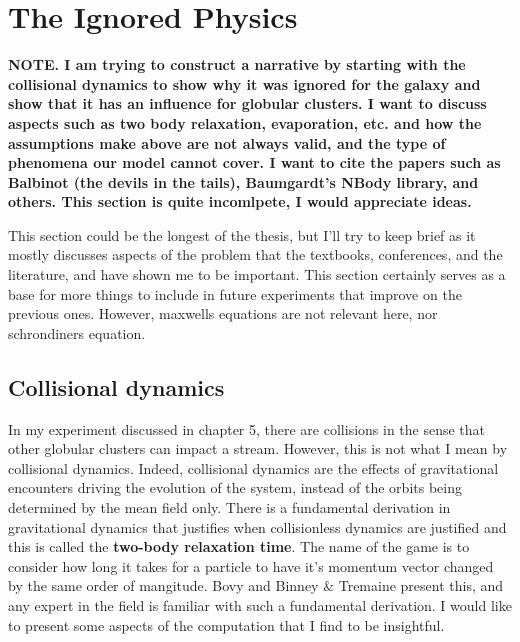 \section{The Ignored Physics}


    \textbf{NOTE. I am trying to construct a narrative by starting with the collisional dynamics to show why it was ignored for the galaxy and show that it has an influence for globular clusters. I want to discuss aspects such as two body relaxation, evaporation, etc. and how the assumptions make above are not always valid, and the type of phenomena our model cannot cover. I want to cite the papers such as Balbinot (the devils in the tails), Baumgardt's NBody library, and others. This section is quite incomlpete, I would appreciate ideas.}
    
    This section could be the longest of the thesis, but I'll try to keep brief as it mostly discusses aspects of the problem that the textbooks, conferences, and the literature, and have shown me to be important. This section certainly serves as a base for more things to include in future experiments that improve on the previous ones. However, maxwells equations are not relevant here, nor schrondiners equation. 
        


    \subsection{Collisional dynamics} \label{sec:collisionalDynamics}

        In my experiment discussed in chapter 5, there are collisions in the sense that other globular clusters can impact a stream. However, this is not what I mean by collisional dynamics. Indeed, collisional dynamics are the effects of gravitational encounters driving the evolution of the system, instead of the orbits being determined by the mean field only. There is a fundamental derivation in gravitational dynamics that justifies when collisionless dynamics are justified and this is called the \textbf{two-body relaxation time}. The name of the game is to consider how long it takes for a particle to have it's momentum vector changed by the same order of mangitude. Bovy and Binney \& Tremaine present this, and any expert in the field is familiar with such a fundamental derivation. I would like to present some aspects of the computation that I find to be insightful. 

